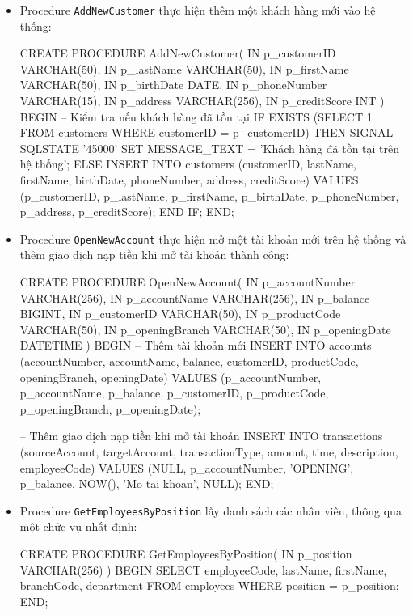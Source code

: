 \begin{itemize}
    \item Procedure \texttt{AddNewCustomer} thực hiện thêm một khách hàng mới vào hệ thống:
    \begin{MySQLCode}
    CREATE PROCEDURE AddNewCustomer(
        IN p_customerID VARCHAR(50),
        IN p_lastName VARCHAR(50),
        IN p_firstName VARCHAR(50),
        IN p_birthDate DATE,
        IN p_phoneNumber VARCHAR(15),
        IN p_address VARCHAR(256),
        IN p_creditScore INT
    )
    BEGIN
        -- Kiểm tra nếu khách hàng đã tồn tại
        IF EXISTS (SELECT 1 FROM customers WHERE customerID = p_customerID) THEN
            SIGNAL SQLSTATE '45000'
                SET MESSAGE_TEXT = 'Khách hàng đã tồn tại trên hệ thống';
        ELSE
            INSERT INTO customers (customerID, lastName, firstName, birthDate, phoneNumber, address, creditScore)
            VALUES (p_customerID, p_lastName, p_firstName, p_birthDate, p_phoneNumber, p_address, p_creditScore);
        END IF;
    END;
    \end{MySQLCode}

    \item Procedure \texttt{OpenNewAccount} thực hiện mở một tài khoản mới trên hệ thống và thêm giao dịch nạp tiền khi mở tài khoản thành công:
    \begin{MySQLCode}
    CREATE PROCEDURE OpenNewAccount(
        IN p_accountNumber VARCHAR(256),
        IN p_accountName VARCHAR(256),
        IN p_balance BIGINT,
        IN p_customerID VARCHAR(50),
        IN p_productCode VARCHAR(50),
        IN p_openingBranch VARCHAR(50),
        IN p_openingDate DATETIME
    )
    BEGIN
        -- Thêm tài khoản mới
        INSERT INTO accounts (accountNumber, accountName, balance, customerID, productCode, openingBranch, openingDate)
        VALUES (p_accountNumber, p_accountName, p_balance, p_customerID, p_productCode, p_openingBranch, p_openingDate);

        -- Thêm giao dịch nạp tiền khi mở tài khoản
        INSERT INTO transactions (sourceAccount, targetAccount, transactionType, amount, time, description, employeeCode)
        VALUES (NULL, p_accountNumber, 'OPENING', p_balance, NOW(), 'Mo tai khoan', NULL);
    END;
    \end{MySQLCode}

    \item Procedure \texttt{GetEmployeesByPosition} lấy danh sách các nhân viên, thông qua một chức vụ nhất định:
    \begin{MySQLCode}
    CREATE PROCEDURE GetEmployeesByPosition(
        IN p_position VARCHAR(256)
    )
    BEGIN
        SELECT employeeCode, lastName, firstName, branchCode, department
        FROM employees
        WHERE position = p_position;
    END;
    \end{MySQLCode}


\end{itemize}
